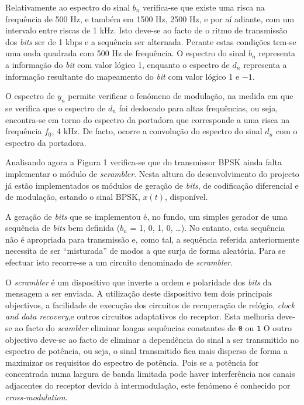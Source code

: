 \documentclass[11pt]{article}
\numberwithin{equation}{section}
\begin{document}
Relativamente ao espectro do sinal $b_n$ verifica-se que existe uma risca na frequência de 500 Hz, e também em 1500 Hz, 2500 Hz, e por aí adiante, com um intervalo entre riscas de 1 kHz. Isto deve-se ao facto de o ritmo de transmissão dos \textit{bits} ser de 1 kbps e a sequência ser alternada. Perante estas condições tem-se uma onda quadrada com 500 Hz de frequência. O espectro do sinal $b_n$ representa a informação do \textit{bit} com valor lógico 1, enquanto o espectro de $d_n$ representa a informação resultante do mapeamento do \textit{bit} com valor lógico 1 e $-1$. 

O espectro de $y_n$ permite verificar o fenómeno de modulação, na medida em que se verifica que o espectro de $d_n$ foi deslocado para altas frequências, ou seja, encontra-se em torno do espectro da portadora que corresponde a uma risca na frequência $f_0$, 4 kHz. De facto, ocorre a convolução do espectro do sinal $d_n$ com o espectro da portadora.

Analisando agora a Figura 1 verifica-se que do transmissor BPSK ainda falta implementar o módulo de \textit{scrambler}. Nesta altura do desenvolvimento do projecto já estão implementados os módulos de geração de \textit{bits}, de codificação diferencial e de modulação, estando o sinal BPSK, $x\left(t\right)$, disponível.

A geração de \textit{bits} que se implementou é, no fundo, um simples gerador de uma sequência de \textit{bits} bem definida ($b_n$ = 1, 0, 1, 0, \ldots). No entanto, esta sequência não é apropriada para transmissão e, como tal, a sequência referida anteriormente necessita de ser ``misturada'' de modos a que surja de forma aleatória. Para se efectuar isto recorre-se a um circuito denominado de \textit{scrambler}.

O \textit{scrambler} é um dispositivo que inverte a ordem e polaridade dos \textit{bits} da mensagem a ser enviada. A utilização deste dispositivo tem dois principais objectivos, a facilidade de execução dos circuitos de recuperação de relógio, \textit{clock and data recovery},e outros circuitos adaptativos do receptor. Esta melhoria deve-se ao facto do \textit{scambler} eliminar longas sequências constantes de \texttt{0} ou \texttt{1} O outro objectivo deve-se ao facto de eliminar a dependência do sinal a ser transmitido no espectro de potência, ou seja, o sinal transmitido fica mais disperso de forma a maximizar os requisitos do espectro de potência. Pois se a potência for concentrada numa largura de banda limitada pode haver interferência nos canais adjacentes do receptor devido à intermodulação, este fenómeno é conhecido por \textit{cross-modulation}.
\end{document}
